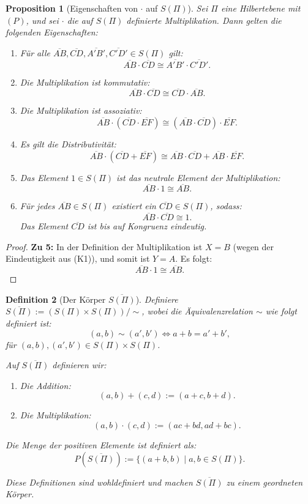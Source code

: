 \documentclass[a4paper,12pt]{article}
\theoremstyle{break}
\newtheorem{definition}{Definition}[section]
\newtheorem{proposition}[definition]{Proposition}
\begin{document}
\begin{proposition}[Eigenschaften von \(\cdot\) auf \(S(\Pi)\)]
Sei \(\Pi\) eine Hilbertebene mit \((P)\), und sei \(\cdot\) die auf \(S(\Pi)\) definierte Multiplikation. Dann gelten die folgenden Eigenschaften:
\begin{enumerate}
    \item Für alle \(\overline{AB}, \overline{CD}, \overline{A'B'}, \overline{C'D'} \in S(\Pi)\) gilt:
    \[
    \overline{AB} \cdot \overline{CD} \cong \overline{A'B'} \cdot \overline{C'D'}.
    \]
    \item Die Multiplikation ist kommutativ:
    \[
    \overline{AB} \cdot \overline{CD} \cong \overline{CD} \cdot \overline{AB}.
    \]
    \item Die Multiplikation ist assoziativ:
    \[
    \overline{AB} \cdot (\overline{CD} \cdot \overline{EF}) \cong (\overline{AB} \cdot \overline{CD}) \cdot \overline{EF}.
    \]
    \item Es gilt die Distributivität:
    \[
    \overline{AB} \cdot (\overline{CD} + \overline{EF}) \cong \overline{AB} \cdot \overline{CD} + \overline{AB} \cdot \overline{EF}.
    \]
    \item Das Element \(1 \in S(\Pi)\) ist das neutrale Element der Multiplikation:
    \[
    \overline{AB} \cdot 1 \cong \overline{AB}.
    \]
    \item Für jedes \(\overline{AB} \in S(\Pi)\) existiert ein \(\overline{CD} \in S(\Pi)\), sodass:
    \[
    \overline{AB} \cdot \overline{CD} \cong 1.
    \]
    Das Element \(\overline{CD}\) ist bis auf Kongruenz eindeutig.
\end{enumerate}
\end{proposition}

\begin{proof}
\textbf{Zu 5:}  
In der Definition der Multiplikation ist \(X = B\) (wegen der Eindeutigkeit aus (K1)), und somit ist \(Y = A\). Es folgt:
\[
\overline{AB} \cdot 1 \cong \overline{AB}.
\]
\end{proof}

\begin{definition}[Der Körper \(\overline{S(\Pi)}\)]\label{def:körper_s_pi}
Definiere \(\overline{S(\Pi)} := (S(\Pi) \times S(\Pi)) / \sim\), wobei die Äquivalenzrelation \(\sim\) wie folgt definiert ist:
\[
(a, b) \sim (a', b') \iff a + b = a' + b',
\]
für \((a, b), (a', b') \in S(\Pi) \times S(\Pi)\).

Auf \(\overline{S(\Pi)}\) definieren wir:
\begin{enumerate}
    \item Die Addition:
    \[
    (a, b) + (c, d) := (a + c, b + d).
    \]
    \item Die Multiplikation:
    \[
    (a, b) \cdot (c, d) := (ac + bd, ad + bc).
    \]
\end{enumerate}

Die Menge der positiven Elemente ist definiert als:
\[
P(\overline{S(\Pi)}) := \{(a + b, b) \mid a, b \in S(\Pi)\}.
\]

Diese Definitionen sind wohldefiniert und machen \(\overline{S(\Pi)}\) zu einem geordneten Körper.
\end{definition}
\end{document}
